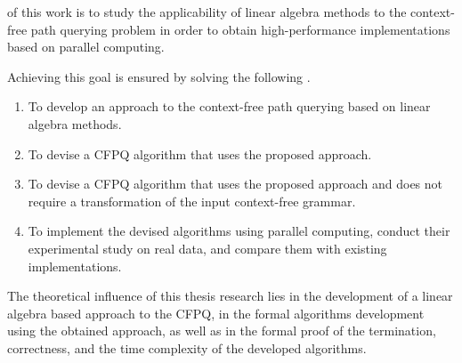 {\aim} of this work is to study the applicability of linear algebra methods to the context-free path querying problem in order to obtain high-performance implementations based on parallel computing.

Achieving this goal is ensured by solving the following {\tasks}.
\begin{enumerate}[beginpenalty=10000] %
  \item To develop an approach to the context-free path querying based on linear algebra methods.
  \item To devise a CFPQ algorithm that uses the proposed approach.
  \item To devise a CFPQ algorithm that uses the proposed approach and does not require a transformation of the input context-free grammar.
  \item To implement the devised algorithms using parallel computing, conduct their experimental study on real data, and compare them with existing implementations.
\end{enumerate}


{\influence} 
The theoretical influence of this thesis research lies in the development of a linear algebra based approach to the CFPQ, in the formal algorithms development using the obtained approach, as well as in the formal proof of the termination, correctness, and the time complexity of the developed algorithms.

